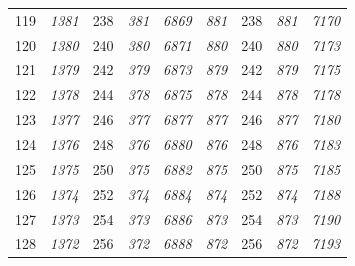 \documentclass[10pt,fleqn]{article}
\begin{document}
\begin{longtable}{c|cccccccc}
119 & {\color{blue} \it 1381 \rm} & {\color{black} 238} & {\color{blue} \it 381 \rm} & {\color{blue} \it 6869 \rm} & {\color{blue} \it 881 \rm} & {\color{black} 238} & {\color{blue} \it 881 \rm} & {\color{blue} \it 7170 \rm} \\
120 & {\color{blue} \it 1380 \rm} & {\color{black} 240} & {\color{blue} \it 380 \rm} & {\color{blue} \it 6871 \rm} & {\color{blue} \it 880 \rm} & {\color{black} 240} & {\color{blue} \it 880 \rm} & {\color{blue} \it 7173 \rm} \\
121 & {\color{blue} \it 1379 \rm} & {\color{black} 242} & {\color{blue} \it 379 \rm} & {\color{blue} \it 6873 \rm} & {\color{blue} \it 879 \rm} & {\color{black} 242} & {\color{blue} \it 879 \rm} & {\color{blue} \it 7175 \rm} \\
122 & {\color{blue} \it 1378 \rm} & {\color{black} 244} & {\color{blue} \it 378 \rm} & {\color{blue} \it 6875 \rm} & {\color{blue} \it 878 \rm} & {\color{black} 244} & {\color{blue} \it 878 \rm} & {\color{blue} \it 7178 \rm} \\
123 & {\color{blue} \it 1377 \rm} & {\color{black} 246} & {\color{blue} \it 377 \rm} & {\color{blue} \it 6877 \rm} & {\color{blue} \it 877 \rm} & {\color{black} 246} & {\color{blue} \it 877 \rm} & {\color{blue} \it 7180 \rm} \\
124 & {\color{blue} \it 1376 \rm} & {\color{black} 248} & {\color{blue} \it 376 \rm} & {\color{blue} \it 6880 \rm} & {\color{blue} \it 876 \rm} & {\color{black} 248} & {\color{blue} \it 876 \rm} & {\color{blue} \it 7183 \rm} \\
125 & {\color{blue} \it 1375 \rm} & {\color{black} 250} & {\color{blue} \it 375 \rm} & {\color{blue} \it 6882 \rm} & {\color{blue} \it 875 \rm} & {\color{black} 250} & {\color{blue} \it 875 \rm} & {\color{blue} \it 7185 \rm} \\
126 & {\color{blue} \it 1374 \rm} & {\color{black} 252} & {\color{blue} \it 374 \rm} & {\color{blue} \it 6884 \rm} & {\color{blue} \it 874 \rm} & {\color{black} 252} & {\color{blue} \it 874 \rm} & {\color{blue} \it 7188 \rm} \\
127 & {\color{blue} \it 1373 \rm} & {\color{black} 254} & {\color{blue} \it 373 \rm} & {\color{blue} \it 6886 \rm} & {\color{blue} \it 873 \rm} & {\color{black} 254} & {\color{blue} \it 873 \rm} & {\color{blue} \it 7190 \rm} \\
128 & {\color{blue} \it 1372 \rm} & {\color{black} 256} & {\color{blue} \it 372 \rm} & {\color{blue} \it 6888 \rm} & {\color{blue} \it 872 \rm} & {\color{black} 256} & {\color{blue} \it 872 \rm} & {\color{blue} \it 7193 \rm} \\

\end{longtable}
\end{document}
